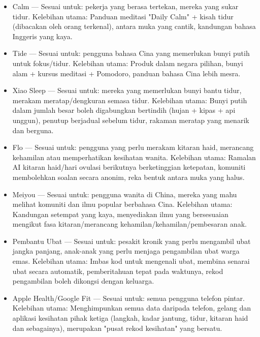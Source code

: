 \begin{itemize}
  \item Calm — Sesuai untuk: pekerja yang berasa tertekan, mereka yang sukar tidur. Kelebihan utama: Panduan meditasi "Daily Calm" + kisah tidur (dibacakan oleh orang terkenal), antara muka yang cantik, kandungan bahasa Inggeris yang kaya.
  \item Tide — Sesuai untuk: pengguna bahasa Cina yang memerlukan bunyi putih untuk fokus/tidur. Kelebihan utama: Produk dalam negara pilihan, bunyi alam + kursus meditasi + Pomodoro, panduan bahasa Cina lebih mesra.
  \item Xiao Sleep — Sesuai untuk: mereka yang memerlukan bunyi bantu tidur, merakam meratap/dengkuran semasa tidur. Kelebihan utama: Bunyi putih dalam jumlah besar boleh digabungkan bertindih (hujan + kipas + api unggun), penutup berjadual sebelum tidur, rakaman meratap yang menarik dan berguna.
\end{itemize}


\begin{itemize}
  \item Flo — Sesuai untuk: pengguna yang perlu merakam kitaran haid, merancang kehamilan atau memperhatikan kesihatan wanita. Kelebihan utama: Ramalan AI kitaran haid/hari ovulasi berikutnya berketinggian ketepatan, komuniti membolehkan soalan secara anonim, reka bentuk antara muka yang halus.
  \item Meiyou — Sesuai untuk: pengguna wanita di China, mereka yang mahu melihat komuniti dan ilmu popular berbahasa Cina. Kelebihan utama: Kandungan setempat yang kaya, menyediakan ilmu yang bersesuaian mengikut fasa kitaran/merancang kehamilan/kehamilan/pembesaran anak.
\end{itemize}


\begin{itemize}
  \item Pembantu Ubat — Sesuai untuk: pesakit kronik yang perlu mengambil ubat jangka panjang, anak-anak yang perlu menjaga pengambilan ubat warga emas. Kelebihan utama: Imbas kod untuk mengenali ubat, membina senarai ubat secara automatik, pemberitahuan tepat pada waktunya, rekod pengambilan boleh dikongsi dengan keluarga.
\end{itemize}


\begin{itemize}
  \item Apple Health/Google Fit — Sesuai untuk: semua pengguna telefon pintar. Kelebihan utama: Menghimpunkan semua data daripada telefon, gelang dan aplikasi kesihatan pihak ketiga (langkah, kadar jantung, tidur, kitaran haid dan sebagainya), merupakan "pusat rekod kesihatan" yang bersatu.
\end{itemize}

